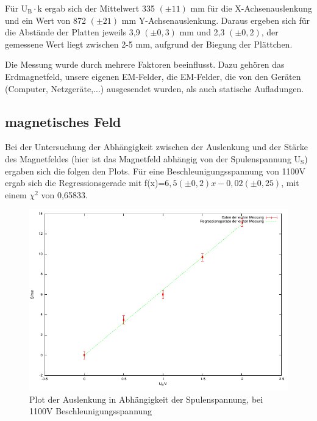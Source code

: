 \documentclass[12pt]{scrartcl}
\begin{document}
Für U$_\text{B} \cdot \text{k}$ ergab sich der Mittelwert 335 $(\pm 11)$ mm für die X-Achsenauslenkung und ein Wert von 872	$(\pm 21)$ mm Y-Achsenauslenkung.
Daraus ergeben sich für die Abstände der Platten jeweils 3,9 $(\pm 0,3)$ mm und 2,3	$(\pm 0,2)$, der gemessene Wert liegt zwischen 2-5 mm, aufgrund der Biegung der Plättchen.

Die Messung wurde durch mehrere Faktoren beeinflusst. Dazu gehören das Erdmagnetfeld, unsere eigenen EM-Felder, die EM-Felder, die von den Geräten (Computer, Netzgeräte,...) ausgesendet wurden, als auch statische Aufladungen.

\subsection{magnetisches Feld}

Bei der Untersuchung der Abhängigkeit zwischen der Auslenkung und der Stärke des Magnetfeldes (hier ist das Magnetfeld abhängig von der Spulenspannung U$_\text{S}$) ergaben sich die folgen den Plots.
\newpage
Für eine Beschleunigungsspannung von 1100V ergab sich die Regressionsgerade mit f(x)=$6,5 (\pm 0,2) x  - 0,02 (\pm 0,25)$, mit einem $\chi^2$ von 0,65833.

\begin{figure}[htbp] 
  \centering
    \includegraphics[scale = 1]{b_1.pdf}
  	\caption[Plot der Auslenkung in Abhängigkeit der Spulenspannung, bei 1100V Beschleunigungsspannung]{Plot der Auslenkung in Abhängigkeit der Spulenspannung, bei 1100V Beschleunigungsspannung}
  \label{fig:x_1}
\end{figure}

\newpage
\end{document}
